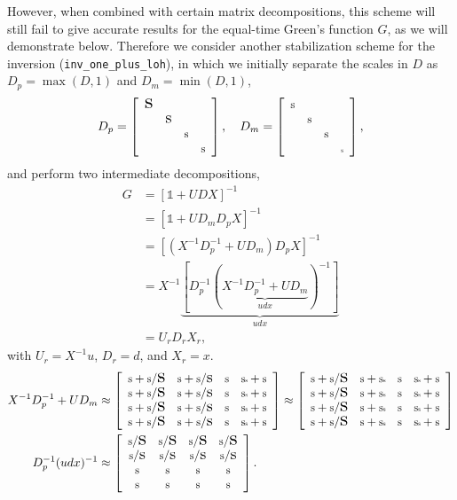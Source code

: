 \documentclass[submission, Phys]{SciPost}
\newcommand{\stiny}{\scalebox{0.5}{s}}
\newcommand{\ssmall}{\scalebox{0.9}{s}}
\newcommand{\smedium}{\scalebox{1.3}{s}}
\newcommand{\slarge}{\scalebox{1.7}{s}}
\newcommand{\Dp}{\left[
	\begin{array}{cccc}
		\slarge &  &  &  \\
		& \smedium &  &  \\
		&  & \ssmall &  \\
		&  &  & \ssmall \\
	\end{array}
	\right]}
\newcommand{\Dm}{\left[
	\begin{array}{cccc}
		\ssmall &  &  &  \\
		& \ssmall &  &  \\
		&  & \ssmall &  \\
		&  &  & \stiny \\
	\end{array}
	\right]}
\begin{document}
However, when combined with certain matrix decompositions, this scheme will still fail to give accurate results for the equal-time Green's function $G$, as we will demonstrate below. Therefore we consider another stabilization scheme for the inversion \cite{Loh2005, Loh1989} (\texttt{inv\_one\_plus\_loh}), in which we initially separate the scales in $D$ as $D_p = \max(D, 1)$ and $D_m = \min(D, 1)$,
\begin{align}
D_p = \Dp, \quad D_m = \Dm,
\end{align}
and perform two intermediate decompositions,
\begin{align}
	G &= [\mathbb{1} + UDX]^{-1} \nonumber\\
	&= [\mathbb{1} + UD_mD_pX]^{-1} \nonumber\\
	&= [(X^{-1} D_p^{-1} + U D_m) D_p X]^{-1} \label{eq:inversion_loh} \\
	&= X^{-1} \underbrace{[D_p^{-1} (\underbrace{X^{-1} D_p^{-1} + UD_m}_{udx})^{-1}]}_{udx} \nonumber \\
	&= U_r D_r X_r, \nonumber
\end{align}
with $U_r = X^{-1}u$, $D_r = d$, and $X_r = x$.
\begin{align}
	X^{-1} D_p^{-1} + UD_m &\approx \left[
	\begin{array}{cccc}
	\ssmall + \ssmall/\slarge & \ssmall + \ssmall/\smedium & \ssmall& \ssmall\stiny + \ssmall \\
	\ssmall + \ssmall/\slarge & \ssmall + \ssmall/\smedium & \ssmall& \ssmall\stiny + \ssmall \\
	\ssmall + \ssmall/\slarge & \ssmall + \ssmall/\smedium & \ssmall& \ssmall\stiny + \ssmall \\
	\ssmall + \ssmall/\slarge & \ssmall + \ssmall/\smedium & \ssmall& \ssmall\stiny + \ssmall \\
	\end{array}
	\right] \approx \left[
	\begin{array}{cccc}
	\ssmall + \ssmall/\slarge & \ssmall + \ssmall\stiny & \ssmall& \ssmall\stiny + \ssmall \\
	\ssmall + \ssmall/\slarge & \ssmall + \ssmall\stiny & \ssmall& \ssmall\stiny + \ssmall \\
	\ssmall + \ssmall/\slarge & \ssmall + \ssmall\stiny & \ssmall& \ssmall\stiny + \ssmall \\
	\ssmall + \ssmall/\slarge & \ssmall + \ssmall\stiny & \ssmall& \ssmall\stiny + \ssmall \\
	\end{array}
	\right] \\
D_p^{-1} (udx)^{-1} &\approx \left[
\begin{array}{cccc}
\ssmall/\slarge & \ssmall/\slarge & \ssmall/\slarge & \ssmall/\slarge \\
\ssmall/\smedium & \ssmall/\smedium & \ssmall/\smedium & \ssmall/\smedium \\
\ssmall & \ssmall & \ssmall & \ssmall \\
\ssmall & \ssmall & \ssmall & \ssmall \\
\end{array}
\right].
\end{align}
\end{document}
